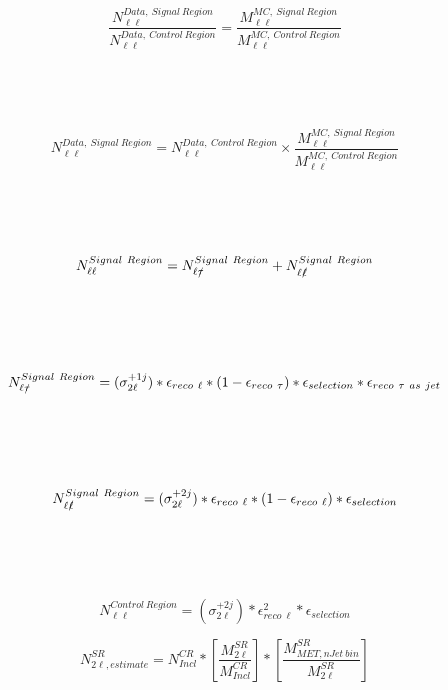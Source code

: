 \documentclass{article}
\newcommand{\dataSR}{\ensuremath{N^{Data,~Signal~Region}_{\ell\ell}}}
\newcommand{\dataCR}{\ensuremath{N^{Data,~Control~Region}_{\ell\ell}}}
\newcommand{\mcSR}{\ensuremath{M^{MC,~Signal~Region}_{\ell\ell}}}
\newcommand{\mcCR}{\ensuremath{M^{MC,~Control~Region}_{\ell\ell}}}
\newcommand{\nSR}{\ensuremath{N^{Signal~Region}_{\ell\ell}}}
\newcommand{\nCR}{\ensuremath{N^{Control~Region}_{\ell\ell}}}
\newcommand{\nSRElEl}{\ensuremath{N^{Signal~Region}_{\ell\slashed{\ell}}}}
\newcommand{\nSRElTau}{\ensuremath{N^{Signal~Region}_{\ell\slashed{\tau}}}}
\begin{document}
\begin{equation}\label{eq:Data_MC_Ratio_Equivalence}
\frac{\dataSR}{\dataCR} = \frac{\mcSR}{\mcCR}
\end{equation}
\\
\\
\\
\\
\begin{equation}\label{eq:SignalYield}
\dataSR = \dataCR\times\frac{\mcSR}{\mcCR}
\end{equation}
\\
\\
\\
\\
\begin{equation}\label{eq:SR_Composition}
\nSR = \nSRElTau + \nSRElEl
\end{equation}
\\
\\
\\
\\
\begin{equation}\label{eq:N_SR_LepLostTau}
\nSRElTau = (\sigma^{+1j}_{2\ell})\ast\epsilon_{reco~\ell}\ast(1-\epsilon_{reco~\tau})\ast\epsilon_{selection}\ast\epsilon_{reco~\tau~as~jet}
\end{equation}
\\
\\
\\
\\
\begin{equation}\label{eq:N_SR_LepLostLep}
\nSRElEl = (\sigma^{+2j}_{2\ell})\ast\epsilon_{reco~\ell}\ast(1-\epsilon_{reco~\ell})\ast\epsilon_{selection}
\end{equation}
\\
\\
\\
\\
\begin{equation}\label{eq:N_CR_diLep}
\nCR = (\sigma^{+2j}_{2\ell})\ast\epsilon^{2}_{reco~\ell}\ast\epsilon_{selection}
\end{equation}


\begin{equation}\label{eq:SR_est}
N_{2\ell,estimate}^{SR} = N_{Incl}^{CR}\ast\left[  \frac{ M_{2\ell}^{SR} }{ M_{Incl}^{CR} } \right] \ast \left[ \frac{ M_{MET,nJet~bin}^{SR} }{ M_{2\ell}^{SR} } \right]
\end{equation}
\end{document}
